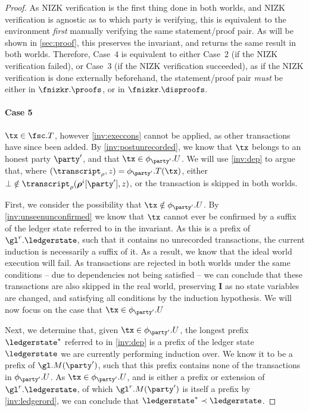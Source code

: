 \begin{proof}
  As NIZK verification is the first thing done in both worlds, and NIZK
  verification is agnostic as to which party is verifying, this is equivalent to
  the environment \emph{first} manually verifying the same statement/proof pair.
  As will be shown in \autoref{sec:proof}, this preserves the invariant, and
  returns the same result in both worlds. Therefore, Case~4 is equivalent to
  either Case~2 (if the NIZK verification failed), or Case~3 (if the NIZK
  verification succeeded), as if the NIZK verification is done externally
  beforehand, the statement/proof pair \emph{must} be either in
  $\fnizkr.\proofs$, or in $\fnizkr.\disproofs$.

  \paragraph{Case 5} $\tx \in \fsc.T$, however
  \ref{inv:execcons} cannot be applied, as other transactions have since been
  added. By \ref{inv:postunrecorded}, we know that $\tx$ belongs to an honest
  party $\party'$, and that $\tx \in \phi_{\party'}.U$. We will use \ref{inv:dep}
  to argue that, where $(\transcript_\rho, z) = \phi_{\party'}.T(\tx)$,
  either $\bot \notin \transcript_\rho(\boldsymbol\rho^i[\party'], z)$, or the
  transaction is skipped in both worlds.

  First, we consider the possibility that $\tx \notin \phi_{\party'}.U$. By
  \ref{inv:unseenunconfirmed} we know that $\tx$ cannot ever be confirmed by a
  suffix of the ledger state referred to in the invariant. As this is a prefix
  of $\gl^r.\ledgerstate$, such that it contains no unrecorded transactions, the
  current induction is necessarily a suffix of it. As a result, we know that the
  ideal world execution will fail. As transactions are rejected in both worlds
  under the same conditions -- due to dependencies not being satisfied
  -- we can conclude that these transactions
  are also skipped in the real world, preserving $\boldsymbol I$ as no state
  variables are changed, and satisfying all conditions by the induction
  hypothesis. We will now focus on the case that $\tx \in \phi_{\party'}.U$

  Next, we determine that, given $\tx \in \phi_{\party'}.U$, the longest prefix
  $\ledgerstate^*$ referred to in \ref{inv:dep} is a prefix of the ledger state
  $\ledgerstate$ we are currently performing induction over. We know it to be a
  prefix of $\gl.M(\party')$, such that this prefix contains none of the
  transactions in $\phi_{\party'}.U$. As $\tx \in \phi_{\party'}.U$, and is
  either a prefix or extension of $\gl^r.\ledgerstate$, of which
  $\gl^r.M(\party')$ is itself a prefix by \ref{inv:ledgerord}, we can conclude
  that $\ledgerstate^* \prec \ledgerstate$.


\end{proof}
